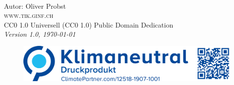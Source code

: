 \newpage
~\vfill
\thispagestyle{empty}

\noindent Autor: Oliver Probst\\

\noindent \textsc{www.tik.ginf.ch}\\

\noindent \ccLogo \hspace{0.1cm} \ccZero \hspace{0.1cm} CC0 1.0 Universell (CC0 1.0) Public Domain Dedication \\

\noindent \textit{Version 1.0, \today}

\begin{figure}[htb]
\includegraphics[scale=0.15]{climate}
\end{figure}
